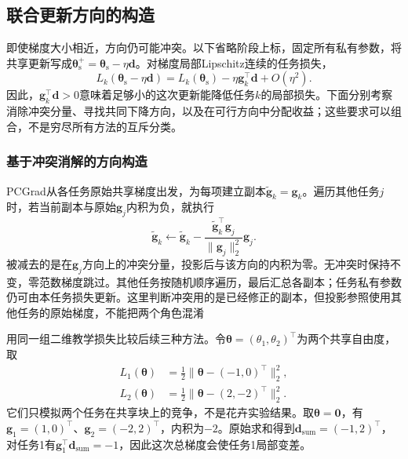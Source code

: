 \subsection{联合更新方向的构造}
\label{sec:ket-sharing-directions}

即使梯度大小相近，方向仍可能冲突。以下省略阶段上标，固定所有私有参数，将共享更新写成$\bm{\theta}_{\mathrm s}^{+}=\bm{\theta}_{\mathrm s}-\eta\bm d$。对梯度局部Lipschitz连续的任务损失，
\begin{equation}
  L_k(\bm{\theta}_{\mathrm s}-\eta\bm d)
  =L_k(\bm{\theta}_{\mathrm s})
   -\eta\bm g_k^{\top}\bm d+O(\eta^2).
  \label{eq:ket-sharing-direction-effect}
\end{equation}
因此，$\bm g_k^{\top}\bm d>0$意味着足够小的这次更新能降低任务$k$的局部损失。下面分别考察消除冲突分量、寻找共同下降方向，以及在可行方向中分配收益；这些要求可以组合，不是穷尽所有方法的互斥分类。

\subsubsection{基于冲突消解的方向构造}
\label{sec:ket-sharing-pcgrad}

PCGrad从各任务原始共享梯度出发，为每项建立副本$\widetilde{\bm g}_k=\bm g_k$。遍历其他任务$j$时，若当前副本与原始$\bm g_j$内积为负，就执行
\begin{equation}
  \widetilde{\bm g}_k\leftarrow
  \widetilde{\bm g}_k-
  \frac{\widetilde{\bm g}_k^{\top}\bm g_j}
       {\|\bm g_j\|_2^2}\bm g_j.
  \label{eq:ket-sharing-pcgrad-projection}
\end{equation}
被减去的是在$\bm g_j$方向上的冲突分量，投影后与该方向的内积为零。无冲突时保持不变，零范数梯度跳过。其他任务按随机顺序遍历，最后汇总各副本；任务私有参数仍可由本任务损失更新。这里判断冲突用的是已经修正的副本，但投影参照使用其他任务的原始梯度，不能把两个角色混淆

用同一组二维教学损失比较后续三种方法。令$\bm\theta=(\theta_1,\theta_2)^{\top}$为两个共享自由度，取
\begin{align}
  L_1(\bm\theta)
    &=\tfrac12\|\bm\theta-(-1,0)^{\top}\|_2^2,
  \nonumber\\
  L_2(\bm\theta)
    &=\tfrac12\|\bm\theta-(2,-2)^{\top}\|_2^2.
  \label{eq:ket-sharing-toy-losses}
\end{align}
它们只模拟两个任务在共享块上的竞争，不是花卉实验结果。取$\bm\theta=\bm0$，有$\bm g_1=(1,0)^{\top}$、$\bm g_2=(-2,2)^{\top}$，内积为$-2$。原始求和得到$\bm d_{\mathrm{sum}}=(-1,2)^{\top}$，对任务1有$\bm g_1^{\top}\bm d_{\mathrm{sum}}=-1$，因此这次总梯度会使任务1局部变差。

